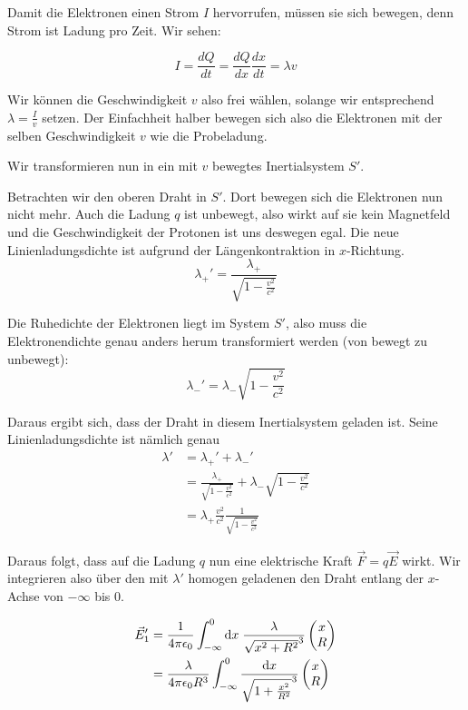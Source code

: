 \documentclass[a4paper,german,12pt,smallheadings]{scrartcl}
\begin{document}
Damit die Elektronen einen Strom $I$ hervorrufen, müssen sie sich bewegen, denn
Strom ist Ladung pro Zeit. Wir sehen:

\begin{equation}
  I = \frac{dQ}{dt} = \frac{dQ}{dx} \frac{dx}{dt} = \lambda v
\end{equation}

Wir können die Geschwindigkeit $v$ also frei wählen, solange wir entsprechend
$\lambda = \frac{I}{v}$ setzen. Der Einfachheit halber bewegen sich also die
Elektronen mit der selben Geschwindigkeit $v$ wie die Probeladung.

Wir transformieren nun in ein mit $v$ bewegtes Inertialsystem $S'$.

Betrachten wir den oberen Draht in $S'$. Dort bewegen sich die Elektronen nun
nicht mehr. Auch die Ladung $q$ ist unbewegt, also wirkt auf sie kein
Magnetfeld und die Geschwindigkeit der Protonen ist uns deswegen egal. Die neue
Linienladungsdichte ist aufgrund der Längenkontraktion in $x$-Richtung.
\begin{equation}
  \lambda_+' = \frac{\lambda_+}{\sqrt{1 - \frac{v^2}{c^2}}}
\end{equation}

Die Ruhedichte der Elektronen liegt im System $S'$, also muss die
Elektronendichte genau anders herum transformiert werden (von bewegt zu
unbewegt):
\begin{equation}
  \lambda_-' = \lambda_- \sqrt{1 - \frac{v^2}{c^2}}
\end{equation}

Daraus ergibt sich, dass der Draht in diesem Inertialsystem geladen ist. Seine
Linienladungsdichte ist nämlich genau
\begin{align*}
  \lambda' &= \lambda_+' + \lambda_-' \\
       &= \frac{\lambda_+}{\sqrt{1 - \frac{v^2}{c^2}}} + \lambda_- \sqrt{1 - \frac{v^2}{c^2}} \\
       &= \lambda_{+} \frac{v^2}{c^2} \frac{1}{\sqrt{1-\frac{v^2}{c^2}}}
\end{align*}

Daraus folgt, dass auf die Ladung $q$ nun eine elektrische Kraft $\vec{F} = q
\vec{E}$ wirkt. Wir integrieren also über den mit $\lambda'$ homogen geladenen
den Draht entlang der $x$-Achse von $-\infty$ bis $0$.

\begin{align*}
  \vec{E}'_1 &= \frac{1}{4 \pi \epsilon_0} \int_{-\infty}^0 \dif x \;
  \frac{\lambda}{\sqrt{x^2 + R^2}^3} \begin{pmatrix} x \\ R \end{pmatrix} \\
  &= \frac{\lambda}{4 \pi \epsilon_0 R^3} \int_{-\infty}^0
  \frac{\dif x}{\sqrt{1 + \frac{x^2}{R^2}}^3} \begin{pmatrix} x \\ R \end{pmatrix}
\end{align*}
\end{document}
